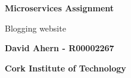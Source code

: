 \begin{titlepage}
    \begin{center}
    	
        \vspace*{1cm}
        
        \textbf{Microservices Assignment}
        
        \vspace{0.5cm}
        Blogging website
        
        \vspace{1.5cm}
        
        \textbf{David Ahern - R00002267}
        
        \vspace{0.5cm}
        \textbf{Cork Institute of Technology}
        
    \end{center}
\end{titlepage}